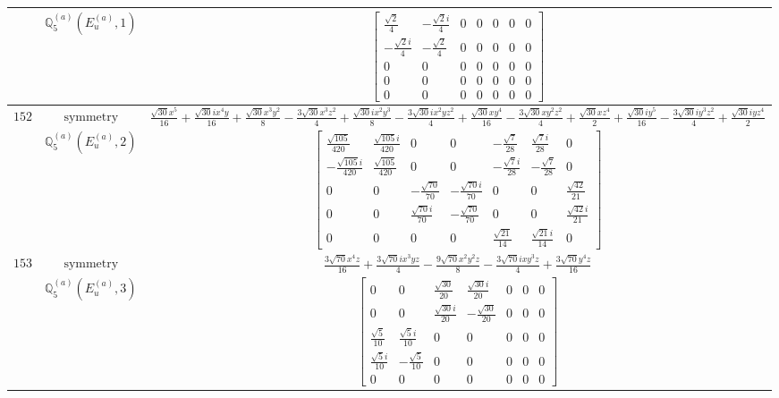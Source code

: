 \documentclass[fleqn,8pt,landscape]{jsarticle}
\begin{document}
\begin{longtable}{ccc}
$  $ & $ \mathbb{Q}_{5}^{(a)}(E_{u}^{(a)},1) $ & $ \begin{bmatrix} \frac{\sqrt{2}}{4} & - \frac{\sqrt{2} i}{4} & 0 & 0 & 0 & 0 & 0 \\ - \frac{\sqrt{2} i}{4} & - \frac{\sqrt{2}}{4} & 0 & 0 & 0 & 0 & 0 \\ 0 & 0 & 0 & 0 & 0 & 0 & 0 \\ 0 & 0 & 0 & 0 & 0 & 0 & 0 \\ 0 & 0 & 0 & 0 & 0 & 0 & 0 \end{bmatrix} $ \\ \hline
$ 152 $ & $ \text{symmetry} $ & $ \frac{\sqrt{30} x^{5}}{16} + \frac{\sqrt{30} i x^{4} y}{16} + \frac{\sqrt{30} x^{3} y^{2}}{8} - \frac{3 \sqrt{30} x^{3} z^{2}}{4} + \frac{\sqrt{30} i x^{2} y^{3}}{8} - \frac{3 \sqrt{30} i x^{2} y z^{2}}{4} + \frac{\sqrt{30} x y^{4}}{16} - \frac{3 \sqrt{30} x y^{2} z^{2}}{4} + \frac{\sqrt{30} x z^{4}}{2} + \frac{\sqrt{30} i y^{5}}{16} - \frac{3 \sqrt{30} i y^{3} z^{2}}{4} + \frac{\sqrt{30} i y z^{4}}{2} $ \\
$  $ & $ \mathbb{Q}_{5}^{(a)}(E_{u}^{(a)},2) $ & $ \begin{bmatrix} \frac{\sqrt{105}}{420} & \frac{\sqrt{105} i}{420} & 0 & 0 & - \frac{\sqrt{7}}{28} & \frac{\sqrt{7} i}{28} & 0 \\ - \frac{\sqrt{105} i}{420} & \frac{\sqrt{105}}{420} & 0 & 0 & - \frac{\sqrt{7} i}{28} & - \frac{\sqrt{7}}{28} & 0 \\ 0 & 0 & - \frac{\sqrt{70}}{70} & - \frac{\sqrt{70} i}{70} & 0 & 0 & \frac{\sqrt{42}}{21} \\ 0 & 0 & \frac{\sqrt{70} i}{70} & - \frac{\sqrt{70}}{70} & 0 & 0 & \frac{\sqrt{42} i}{21} \\ 0 & 0 & 0 & 0 & \frac{\sqrt{21}}{14} & \frac{\sqrt{21} i}{14} & 0 \end{bmatrix} $ \\ \hline
$ 153 $ & $ \text{symmetry} $ & $ \frac{3 \sqrt{70} x^{4} z}{16} + \frac{3 \sqrt{70} i x^{3} y z}{4} - \frac{9 \sqrt{70} x^{2} y^{2} z}{8} - \frac{3 \sqrt{70} i x y^{3} z}{4} + \frac{3 \sqrt{70} y^{4} z}{16} $ \\
$  $ & $ \mathbb{Q}_{5}^{(a)}(E_{u}^{(a)},3) $ & $ \begin{bmatrix} 0 & 0 & \frac{\sqrt{30}}{20} & \frac{\sqrt{30} i}{20} & 0 & 0 & 0 \\ 0 & 0 & \frac{\sqrt{30} i}{20} & - \frac{\sqrt{30}}{20} & 0 & 0 & 0 \\ \frac{\sqrt{5}}{10} & \frac{\sqrt{5} i}{10} & 0 & 0 & 0 & 0 & 0 \\ \frac{\sqrt{5} i}{10} & - \frac{\sqrt{5}}{10} & 0 & 0 & 0 & 0 & 0 \\ 0 & 0 & 0 & 0 & 0 & 0 & 0 \end{bmatrix} $ \\ \hline

\end{longtable}
\end{document}
